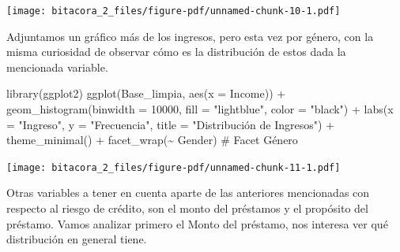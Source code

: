 \documentclass[
  letterpaper,
  DIV=11,
  numbers=noendperiod]{scrreprt}
\newenvironment{Shaded}{\begin{snugshade}}{\end{snugshade}}
\newcommand{\AttributeTok}[1]{\textcolor[rgb]{0.40,0.45,0.13}{#1}}
\newcommand{\CommentTok}[1]{\textcolor[rgb]{0.37,0.37,0.37}{#1}}
\newcommand{\DecValTok}[1]{\textcolor[rgb]{0.68,0.00,0.00}{#1}}
\newcommand{\FunctionTok}[1]{\textcolor[rgb]{0.28,0.35,0.67}{#1}}
\newcommand{\NormalTok}[1]{\textcolor[rgb]{0.00,0.23,0.31}{#1}}
\newcommand{\SpecialCharTok}[1]{\textcolor[rgb]{0.37,0.37,0.37}{#1}}
\newcommand{\StringTok}[1]{\textcolor[rgb]{0.13,0.47,0.30}{#1}}
\begin{document}
\texttt{[image: bitacora\_2\_files/figure-pdf/unnamed-chunk-10-1.pdf]}

Adjuntamos un gráfico más de los ingresos, pero esta vez por género, con
la misma curiosidad de observar cómo es la distribución de estos dada la
mencionada variable.

\begin{Shaded}
\begin{Highlighting}[]
\FunctionTok{library}\NormalTok{(ggplot2)}
\FunctionTok{ggplot}\NormalTok{(Base\_limpia, }\FunctionTok{aes}\NormalTok{(}\AttributeTok{x =}\NormalTok{ Income)) }\SpecialCharTok{+} 
  \FunctionTok{geom\_histogram}\NormalTok{(}\AttributeTok{binwidth =} \DecValTok{10000}\NormalTok{, }\AttributeTok{fill =} \StringTok{"lightblue"}\NormalTok{, }\AttributeTok{color =} \StringTok{"black"}\NormalTok{) }\SpecialCharTok{+} 
  \FunctionTok{labs}\NormalTok{(}\AttributeTok{x =} \StringTok{"Ingreso"}\NormalTok{, }\AttributeTok{y =} \StringTok{"Frecuencia"}\NormalTok{, }\AttributeTok{title =} \StringTok{"Distribución de Ingresos"}\NormalTok{) }\SpecialCharTok{+} \FunctionTok{theme\_minimal}\NormalTok{() }\SpecialCharTok{+}
  \FunctionTok{facet\_wrap}\NormalTok{(}\SpecialCharTok{\textasciitilde{}}\NormalTok{ Gender)  }\CommentTok{\# Facet Género}
\end{Highlighting}
\end{Shaded}

\texttt{[image: bitacora\_2\_files/figure-pdf/unnamed-chunk-11-1.pdf]}

Otras variables a tener en cuenta aparte de las anteriores mencionadas
con respecto al riesgo de crédito, son el monto del préstamos y el
propósito del préstamo. Vamos analizar primero el Monto del préstamo,
nos interesa ver qué distribución en general tiene.
\end{document}
